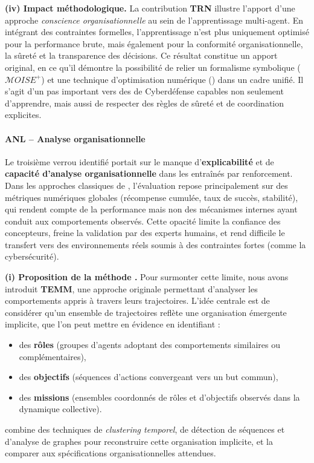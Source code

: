 \medskip
\noindent
\textbf{(iv) Impact méthodologique.}
La contribution \textbf{TRN} illustre l'apport d'une approche \textit{consci\-ence organisationnelle} au sein de l'apprentissage multi-agent.
En intégrant des contraintes formelles, l'apprentissage n'est plus uniquement optimisé pour la performance brute, mais également pour la conformité organisationnelle, la sûreté et la transparence des décisions.
Ce résultat constitue un apport original, en ce qu'il démontre la possibilité de relier un formalisme symbolique ($\mathcal{M}OISE^+$) et une technique d'optimisation numérique () dans un cadre unifié.
Il s'agit d'un pas important vers des  de Cyberdéfense capables non seulement d'apprendre, mais aussi de respecter des règles de sûreté et de coordination explicites.

\paragraph{ANL – Analyse organisationnelle}

Le troisième verrou identifié portait sur le manque d'\textbf{explicabilité} et de \textbf{capacité d'analyse organisationnelle} dans les  entraînés par renforcement.
Dans les approches classiques de , l'évaluation repose principalement sur des métriques numériques globales (récompense cumulée, taux de succès, stabilité), qui rendent compte de la performance mais non des mécanismes internes ayant conduit aux comportements observés.
Cette opacité limite la confiance des concepteurs, freine la validation par des experts humains, et rend difficile le transfert vers des environnements réels soumis à des contraintes fortes (comme la cybersécurité).

\medskip
\noindent
\textbf{(i) Proposition de la méthode .}
Pour surmonter cette limite, nous avons introduit \textbf{TEMM}, une approche originale permettant d'analyser les comportements appris à travers leurs trajectoires.
L'idée centrale est de considérer qu'un ensemble de trajectoires reflète une organisation émergente implicite, que l'on peut mettre en évidence en identifiant :
\begin{itemize}
  \item des \textbf{rôles} (groupes d'agents adoptant des comportements similaires ou complémentaires),
  \item des \textbf{objectifs} (séquences d'actions convergeant vers un but commun),
  \item des \textbf{missions} (ensembles coordonnés de rôles et d'objectifs observés dans la dynamique collective).
\end{itemize}
 combine des techniques de \textit{clustering temporel}, de détection de séquences et d'analyse de graphes pour reconstruire cette organisation implicite, et la comparer aux spécifications organisationnelles attendues.

